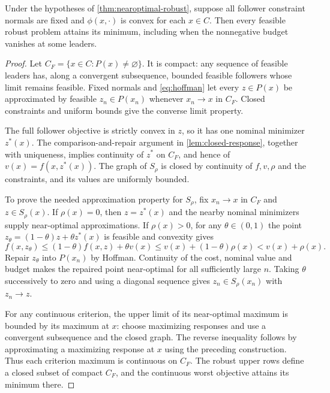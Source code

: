 \begin{proposition}\label{prop:robust-attainment}
Under the hypotheses of \cref{thm:nearoptimal-robust}, suppose all
follower constraint normals are fixed and $\phi(x,\cdot)$ is convex
for each $x\in C$. Then every feasible robust problem attains its
minimum, including when the nonnegative budget vanishes at some leaders.
\end{proposition}
\begin{proof}
Let $C_F=\{x\in C:P(x)\ne\varnothing\}$. It is compact: any sequence
of feasible leaders has, along a convergent subsequence, bounded feasible
followers whose limit remains feasible. Fixed normals and
\eqref{eq:hoffman} let every $z\in P(x)$ be approximated by feasible
$z_n\in P(x_n)$ whenever $x_n\to x$ in $C_F$. Closed constraints
and uniform bounds give the converse limit property.

The full follower objective is strictly convex in $z$, so it has one
nominal minimizer $z^*(x)$. The comparison-and-repair argument in
\cref{lem:closed-response}, together with uniqueness, implies continuity
of $z^*$ on $C_F$, and hence of $v(x)=f(x,z^*(x))$.
The graph of $S_\rho$ is closed by continuity of $f,v,\rho$ and the
constraints, and its values are uniformly bounded.

To prove the needed approximation property for $S_\rho$, fix
$x_n\to x$ in $C_F$ and $z\in S_\rho(x)$. If $\rho(x)=0$, then
$z=z^*(x)$ and the nearby nominal minimizers supply near-optimal
approximations. If $\rho(x)>0$, for any $\theta\in(0,1)$ the point
$z_\theta=(1-\theta)z+\theta z^*(x)$ is feasible and convexity gives
\[
 f(x,z_\theta)\le(1-\theta)f(x,z)+\theta v(x)
             \le v(x)+(1-\theta)\rho(x)<v(x)+\rho(x).
\]
Repair $z_\theta$ into $P(x_n)$ by Hoffman. Continuity of the cost,
nominal value and budget makes the repaired point near-optimal for all
sufficiently large $n$. Taking $\theta$ successively to zero and using
a diagonal sequence gives $z_n\in S_\rho(x_n)$ with $z_n\to z$.

For any continuous criterion, the upper limit of its near-optimal
maximum is bounded by its maximum at $x$: choose maximizing responses
and use a convergent subsequence and the closed graph. The reverse
inequality follows by approximating a maximizing response at $x$ using
the preceding construction. Thus each criterion maximum is continuous
on $C_F$. The robust upper rows define a closed subset of compact
$C_F$, and the continuous worst objective attains its minimum there.
\end{proof}

